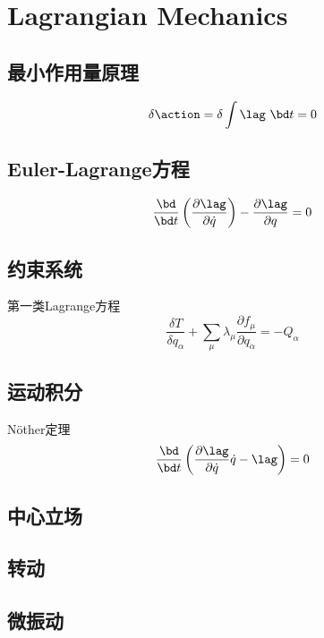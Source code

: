 
\chapter{Lagrangian Mechanics}
\section{最小作用量原理}
\begin{equation}
    \delta \action = \delta \int \lag ~\bd t = 0
\end{equation}

\section{Euler-Lagrange方程}

\begin{equation}
    \frac{\bd}{\bd t} \left(\frac{\partial\lag}{\partial \dot{q}} \right)-\frac{\partial\lag}{\partial q}  = 0
\end{equation}
\section{约束系统}
第一类Lagrange方程\cite{Lagrange1788a}
\begin{equation}
    \frac{\delta T}{\delta q_\alpha} + \sum_\mu \lambda_\mu \frac{\partial f_\mu}{\partial q_\alpha}=-Q_\alpha
\end{equation}

\section{运动积分}

N\"other定理
\begin{equation}
    \frac{\bd}{\bd t} \left( \frac{\partial \lag}{\partial \dot{q}}\dot{q}-\lag \right)=0
\end{equation}

\section{中心立场}
\section{转动}
\section{微振动}
